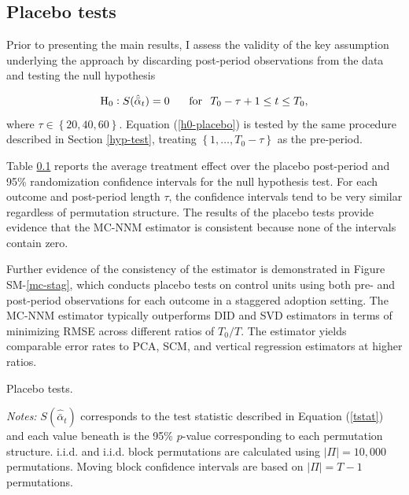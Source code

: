 \documentclass[12pt]{article}
\begin{document}
\subsection{Placebo tests} \label{placebo-tests}

Prior to presenting the main results, I assess the validity of the key assumption underlying the approach by discarding post-period observations from the data and testing the null hypothesis 

\begin{equation} \label{h0-placebo}
\text{H}_0: S (\hat{\bar{\alpha}}_{t}) = 0  \, \hspace{5mm} \,  \text{for} \, \hspace{2mm} T_0 - \tau +1 \leq t \leq T_0,
\end{equation}
where $\tau \in \left\{20, 40, 60\right\}$. Equation (\ref{h0-placebo}) is tested by the same procedure described in Section \ref{hyp-test}, treating $\left\{1, \ldots, T_0 - \tau\right\}$ as the pre-period.

Table \ref{placebo-tests} reports the average treatment effect over the placebo post-period and 95\% randomization confidence intervals for the null hypothesis test. For each outcome and post-period length $\tau$, the confidence intervals tend to be very similar regardless of permutation structure. The results of the placebo tests provide evidence that the MC-NNM estimator is consistent because none of the intervals contain zero. 

Further evidence of the consistency of the estimator is demonstrated in Figure SM-\ref{mc-stag}, which conducts placebo tests on control units using both pre- and post-period observations for each outcome in a staggered adoption setting. The MC-NNM estimator typically outperforms DID and SVD estimators in terms of minimizing RMSE across different ratios of $T_0/T$. The estimator yields comparable error rates to PCA, SCM, and vertical regression estimators at higher ratios. 

\begin{table}[htbp]
	\captionsetup{font=normalsize}
	\caption{Placebo tests.\label{placebo-tests}}
	\begin{center}
	\resizebox{.75\width}{!}{}
	\end{center}
	\footnotesize{\emph{Notes:} $S (\hat{\bar{\alpha}}_{t})$ corresponds to the test statistic described in Equation (\ref{tstat}) and each value beneath is the 95\% $p$-value corresponding to each permutation structure. i.i.d. and i.i.d. block permutations are calculated using $|\Pi| = 10,000$ permutations. Moving block confidence intervals are based on $|\Pi| = T-1$ permutations.}
\end{table}
\end{document}
